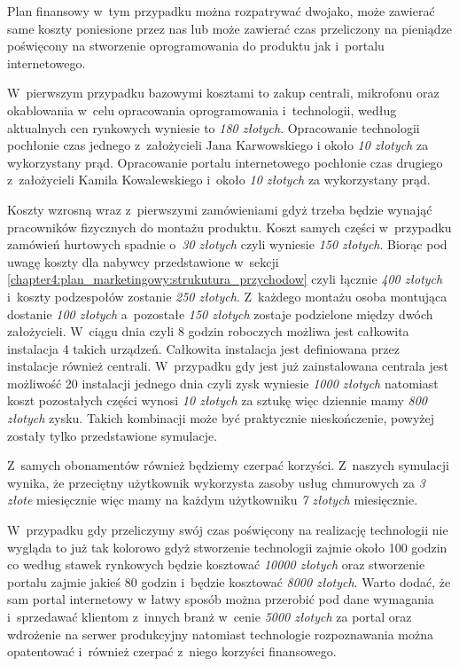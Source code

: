 \documentclass[../main.tex]{subfiles}
\begin{document}
 {
    Plan finansowy w~tym przypadku można rozpatrywać dwojako, może zawierać same koszty
    poniesione przez nas lub może zawierać czas przeliczony na pieniądze poświęcony na
    stworzenie oprogramowania do produktu jak i~portalu internetowego.

    W~pierwszym przypadku bazowymi kosztami to zakup centrali, mikrofonu oraz
    okablowania w~celu opracowania oprogramowania i~technologii, według aktualnych cen
    rynkowych wyniesie to \textit{180 złotych}. Opracowanie technologii pochłonie czas
    jednego z~założycieli Jana Karwowskiego i około \textit{10 złotych} za wykorzystany
    prąd. Opracowanie portalu internetowego pochłonie czas drugiego z~założycieli
    Kamila Kowalewskiego i~około \textit{10 złotych} za wykorzystany prąd.

    Koszty wzrosną wraz z~pierwszymi zamówieniami gdyż trzeba będzie wynająć
    pracowników fizycznych do montażu produktu. Koszt samych części w~przypadku
    zamówień hurtowych spadnie o~\textit{30 złotych} czyli wyniesie \textit{150 złotych}.
    Biorąc pod uwagę koszty dla nabywcy przedstawione w~sekcji
    \ref{chapter4:plan_marketingowy:strukutura_przychodow} czyli łącznie
    \textit{400 złotych} i~koszty podzespołów zostanie \textit{250 złotych}. Z~każdego
    montażu osoba montująca dostanie \textit{100 złotych} a~pozostałe
    \textit{150 złotych} zostaje podzielone między dwóch założycieli. W~ciągu dnia
    czyli 8 godzin roboczych możliwa jest całkowita instalacja 4 takich urządzeń.
    Całkowita instalacja jest definiowana przez instalacje również centrali.
    W~przypadku gdy jest już zainstalowana centrala jest możliwość 20 instalacji jednego
    dnia czyli zysk wyniesie \textit{1000 złotych} natomiast koszt pozostałych
    części wynosi \textit{10 złotych} za sztukę więc dziennie mamy \textit{800 złotych}
    zysku. Takich kombinacji może być praktycznie nieskończenie, powyżej zostały tylko
    przedstawione symulacje.

    Z~samych obonamentów również będziemy czerpać korzyści. Z~naszych symulacji wynika,
    że przeciętny użytkownik wykorzysta zasoby usług chmurowych za \textit{3 złote}
    miesięcznie więc mamy na każdym użytkowniku \textit{7 złotych} miesięcznie.

    W~przypadku gdy przeliczymy swój czas poświęcony na realizację technologii nie
    wygląda to już tak kolorowo gdyż stworzenie technologii zajmie około 100 godzin co
    według stawek rynkowych będzie kosztować \textit{10000 złotych} oraz stworzenie
    portalu zajmie jakieś 80 godzin i~będzie kosztować \textit{8000 złotych}. Warto
    dodać, że sam portal internetowy w łatwy sposób można przerobić pod dane wymagania
    i~sprzedawać klientom z~innych branż w~cenie \textit{5000 złotych} za portal oraz
    wdrożenie na serwer produkcyjny natomiast technologie rozpoznawania można
    opatentować i~również czerpać z~niego korzyści finansowego.
}
\end{document}

